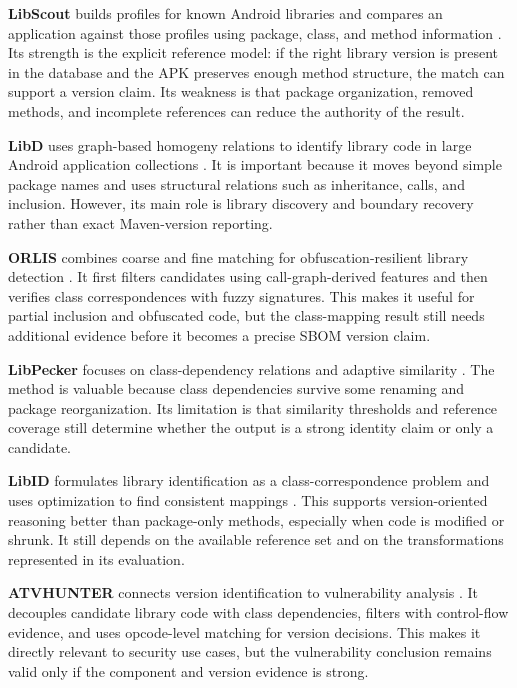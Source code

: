 \textbf{LibScout} builds profiles for known Android libraries and compares an
application against those profiles using package, class, and method
information \cite{backes2016libscout}. Its strength is the explicit reference
model: if the right library version is present in the database and the APK
preserves enough method structure, the match can support a version claim. Its
weakness is that package organization, removed methods, and incomplete
references can reduce the authority of the result.

\textbf{LibD} uses graph-based homogeny relations to identify library code in
large Android application collections \cite{li2017libd}. It is important
because it moves beyond simple package names and uses structural relations
such as inheritance, calls, and inclusion. However, its main role is library
discovery and boundary recovery rather than exact Maven-version reporting.

\textbf{ORLIS} combines coarse and fine matching for obfuscation-resilient
library detection \cite{wang2018orlis}. It first filters candidates using
call-graph-derived features and then verifies class correspondences with fuzzy
signatures. This makes it useful for partial inclusion and obfuscated code,
but the class-mapping result still needs additional evidence before it becomes
a precise SBOM version claim.

\textbf{LibPecker} focuses on class-dependency relations and adaptive
similarity \cite{zhang2018libpecker}. The method is valuable because class
dependencies survive some renaming and package reorganization. Its limitation
is that similarity thresholds and reference coverage still determine whether
the output is a strong identity claim or only a candidate.

\textbf{LibID} formulates library identification as a class-correspondence
problem and uses optimization to find consistent mappings
\cite{zhang2019libid}. This supports version-oriented reasoning better than
package-only methods, especially when code is modified or shrunk. It still
depends on the available reference set and on the transformations represented
in its evaluation.

\textbf{ATVHUNTER} connects version identification to vulnerability analysis
\cite{zhan2021atvhunter}. It decouples candidate library code with class
dependencies, filters with control-flow evidence, and uses opcode-level
matching for version decisions. This makes it directly relevant to security
use cases, but the vulnerability conclusion remains valid only if the
component and version evidence is strong.

